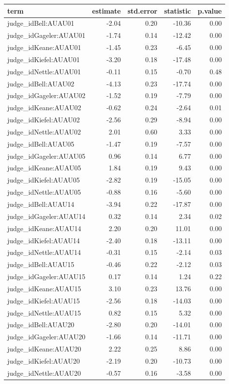 \documentclass{monashthesis}
\begin{document}
\begin{tabular}{l|r|r|r|r}
\hline
term & estimate & std.error & statistic & p.value\\
\hline
judge\_idBell:AUAU01 & -2.04 & 0.20 & -10.36 & 0.00\\
\hline
judge\_idGageler:AUAU01 & -1.74 & 0.14 & -12.42 & 0.00\\
\hline
judge\_idKeane:AUAU01 & -1.45 & 0.23 & -6.45 & 0.00\\
\hline
judge\_idKiefel:AUAU01 & -3.20 & 0.18 & -17.48 & 0.00\\
\hline
judge\_idNettle:AUAU01 & -0.11 & 0.15 & -0.70 & 0.48\\
\hline
judge\_idBell:AUAU02 & -4.13 & 0.23 & -17.74 & 0.00\\
\hline
judge\_idGageler:AUAU02 & -1.52 & 0.19 & -7.79 & 0.00\\
\hline
judge\_idKeane:AUAU02 & -0.62 & 0.24 & -2.64 & 0.01\\
\hline
judge\_idKiefel:AUAU02 & -2.56 & 0.29 & -8.94 & 0.00\\
\hline
judge\_idNettle:AUAU02 & 2.01 & 0.60 & 3.33 & 0.00\\
\hline
judge\_idBell:AUAU05 & -1.47 & 0.19 & -7.57 & 0.00\\
\hline
judge\_idGageler:AUAU05 & 0.96 & 0.14 & 6.77 & 0.00\\
\hline
judge\_idKeane:AUAU05 & 1.84 & 0.19 & 9.43 & 0.00\\
\hline
judge\_idKiefel:AUAU05 & -2.82 & 0.19 & -15.05 & 0.00\\
\hline
judge\_idNettle:AUAU05 & -0.88 & 0.16 & -5.60 & 0.00\\
\hline
judge\_idBell:AUAU14 & -3.94 & 0.22 & -17.87 & 0.00\\
\hline
judge\_idGageler:AUAU14 & 0.32 & 0.14 & 2.34 & 0.02\\
\hline
judge\_idKeane:AUAU14 & 2.20 & 0.20 & 11.01 & 0.00\\
\hline
judge\_idKiefel:AUAU14 & -2.40 & 0.18 & -13.11 & 0.00\\
\hline
judge\_idNettle:AUAU14 & -0.31 & 0.15 & -2.14 & 0.03\\
\hline
judge\_idBell:AUAU15 & -0.46 & 0.22 & -2.12 & 0.03\\
\hline
judge\_idGageler:AUAU15 & 0.17 & 0.14 & 1.24 & 0.22\\
\hline
judge\_idKeane:AUAU15 & 3.10 & 0.23 & 13.76 & 0.00\\
\hline
judge\_idKiefel:AUAU15 & -2.56 & 0.18 & -14.03 & 0.00\\
\hline
judge\_idNettle:AUAU15 & 0.82 & 0.15 & 5.32 & 0.00\\
\hline
judge\_idBell:AUAU20 & -2.80 & 0.20 & -14.01 & 0.00\\
\hline
judge\_idGageler:AUAU20 & -1.66 & 0.14 & -11.71 & 0.00\\
\hline
judge\_idKeane:AUAU20 & 2.22 & 0.25 & 8.86 & 0.00\\
\hline
judge\_idKiefel:AUAU20 & -2.19 & 0.20 & -10.73 & 0.00\\
\hline
judge\_idNettle:AUAU20 & -0.57 & 0.16 & -3.58 & 0.00\\
\hline
\end{tabular}
\end{document}
